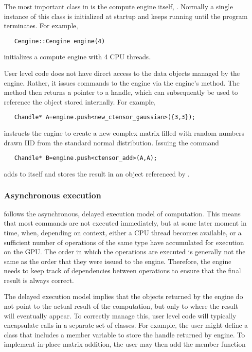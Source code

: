 The most important class in \Cengine{} is the compute engine itself, . 
Normally a single instance of this class is initialized at startup and keeps running until 
the program terminates. For example, 

\texttt{~~~Cengine::Cengine engine(4)}

initializes a compute engine with 4 CPU threads. 

User level code does not have direct access to the data objects managed by the engine. 
Rather, it issues commands to the engine via the engine's  method. 
The  method then returns a pointer to a handle, 
which can subsequently be used to reference the object stored internally. For example, 

\texttt{~~~Chandle* A=engine.push<new\_ctensor\_gaussian>(\{3,3\});}

instructs the engine to create a new  complex matrix filled with random numbers 
drawn IID from the standard normal distribution. Issuing the command 

\texttt{~~~Chandle* B=engine.push<ctensor\_add>(A,A);}

adds  to itself and stores the result in an object referenced by . 

\vspace{-10pt}
\subsubsection*{Asynchronous execution}

\Cengine{} follows the asynchronous, delayed execution model of computation. This means that most  
commands are not executed immediately, but at some later moment in time, when,  
depending on context, either a CPU thread becomes available, or a sufficient number of operations 
of the same type have accumulated for execution on the GPU. 
The order in which the operations are executed is generally not the same as the order that they 
were issued to the engine. 
Therefore, the engine needs to keep track of dependencies between operations to ensure that the final result 
is always correct. 
 

The delayed execution model implies that the  objects returned by the engine do not 
point to the actual result of the computation, but only to where the result will eventually appear. 
To correctly manage this, user level code will typically encapsulate  calls in 
a separate set of classes. For example, the user might define a  class that includes 
a member variable  to store the handle returned by engine. To implement in-place matrix addition, 
the user may then add the member function 

